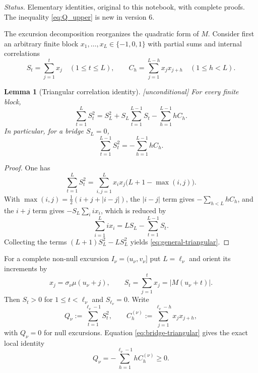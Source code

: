 \documentclass[11pt]{amsart}
\numberwithin{equation}{section}
\theoremstyle{plain}
\newtheorem{lemma}[theorem]{Lemma}
\theoremstyle{definition}
\theoremstyle{remark}
\begin{document}
\noindent\emph{Status.} Elementary identities, original to this notebook,
with complete proofs. The inequality \eqref{eq:Q_upper} is new in version 6.

\medskip

The excursion decomposition reorganizes the quadratic form of $M$. Consider
first an arbitrary finite block $x_1,\dots,x_L\in\{-1,0,1\}$ with partial sums
and internal correlations
\begin{equation}
\label{eq:block_def}
  S_t=\sum_{j=1}^t x_j\quad(1\le t\le L),\qquad
  C_h=\sum_{j=1}^{L-h}x_jx_{j+h}\quad(1\le h<L).
\end{equation}

\begin{lemma}[Triangular correlation identity]
\label{lem:triangular-corr}
\emph{[unconditional]} For every finite block,
\begin{equation}
\label{eq:general-triangular}
  \sum_{t=1}^{L}S_t^2
  =S_L^2+S_L\sum_{t=1}^{L-1}S_t-\sum_{h=1}^{L-1}hC_h.
\end{equation}
In particular, for a bridge $S_L=0$,
\begin{equation}
\label{eq:bridge-triangular}
  \sum_{t=1}^{L-1}S_t^2=-\sum_{h=1}^{L-1}hC_h.
\end{equation}
\end{lemma}

\begin{proof}
One has
\begin{equation}
\label{eq:proof_triangular_max}
  \sum_{t=1}^{L}S_t^2
  =\sum_{i,j=1}^{L}x_ix_j\bigl(L+1-\max(i,j)\bigr).
\end{equation}
With $\max(i,j)=\tfrac12(i+j+|i-j|)$, the $|i-j|$ term gives
$-\sum_{h<L}hC_h$, and the $i+j$ term gives $-S_L\sum_i ix_i$, which is
reduced by
\begin{equation}
\label{eq:proof_triangular_abel}
  \sum_{i=1}^{L} i x_i
  =LS_L-\sum_{t=1}^{L-1}S_t.
\end{equation}
Collecting the terms $(L+1)S_L^2-L S_L^2$ yields
\eqref{eq:general-triangular}.
\end{proof}

For a complete non-null excursion $I_\nu=(u_\nu,v_\nu]$ put $L=\ell_\nu$ and
orient its increments by
\begin{equation}
\label{eq:orientation}
  x_j=\sigma_\nu\mu(u_\nu+j),\qquad
  S_t=\sum_{j=1}^{t}x_j=|M(u_\nu+t)|.
\end{equation}
Then $S_t>0$ for $1\le t<\ell_\nu$ and $S_{\ell_\nu}=0$. Write
\begin{equation}
\label{eq:Q_def}
  Q_\nu:=\sum_{t=1}^{\ell_\nu-1}S_t^2,
  \qquad
  C_h^{(\nu)}:=\sum_{j=1}^{\ell_\nu-h}x_jx_{j+h},
\end{equation}
with $Q_\nu=0$ for null excursions. Equation \eqref{eq:bridge-triangular}
gives the exact local identity
\begin{equation}
\label{eq:Qcorr}
  Q_\nu=-\sum_{h=1}^{\ell_\nu-1}hC_h^{(\nu)}\ge0.
\end{equation}
\end{document}
